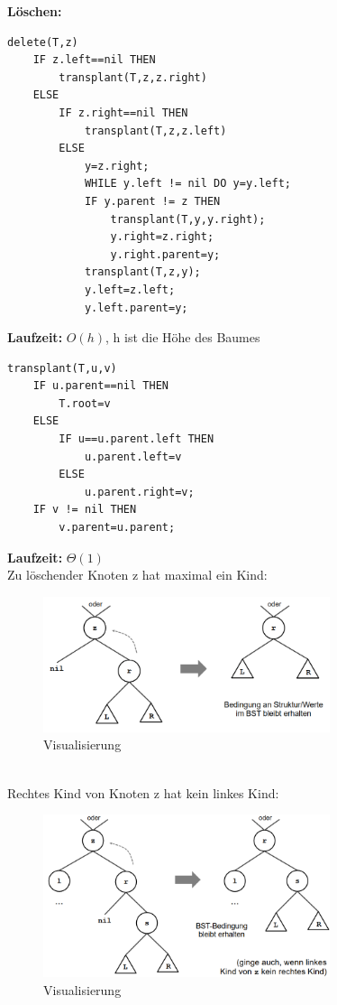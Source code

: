 \documentclass{article}
\begin{document}
            \vspace{30pt}
            \textbf{Löschen:}
            \begin{lstlisting}[style=pseudocode]
delete(T,z)
    IF z.left==nil THEN
        transplant(T,z,z.right)
    ELSE
        IF z.right==nil THEN
            transplant(T,z,z.left)
        ELSE
            y=z.right;
            WHILE y.left != nil DO y=y.left;
            IF y.parent != z THEN
                transplant(T,y,y.right);
                y.right=z.right;
                y.right.parent=y;
            transplant(T,z,y);
            y.left=z.left;
            y.left.parent=y;
            \end{lstlisting}
            \textbf{Laufzeit:} $O(h)$, h ist die Höhe des Baumes
            \begin{lstlisting}[style=pseudocode]
transplant(T,u,v)
    IF u.parent==nil THEN
        T.root=v
    ELSE
        IF u==u.parent.left THEN
            u.parent.left=v
        ELSE
            u.parent.right=v;
    IF v != nil THEN
        v.parent=u.parent;
            \end{lstlisting}
            \textbf{Laufzeit:} $\Theta(1)$\\
            Zu löschender Knoten z hat maximal ein Kind: \\
            \begin{figure}[ht]
                \centering
                \includegraphics[width=0.75\textwidth]{Bilder/BSTdel1.png}
                \caption{Visualisierung}
                \label{fig:BSTdel1}
            \end{figure}\\
            Rechtes Kind von Knoten z hat kein linkes Kind: \\
            \begin{figure}[ht]
                \centering
                \includegraphics[width=0.75\textwidth]{Bilder/BSTdel2.png}
                \caption{Visualisierung}
                \label{fig:BSTdel2}
            \end{figure}\\
\end{document}
